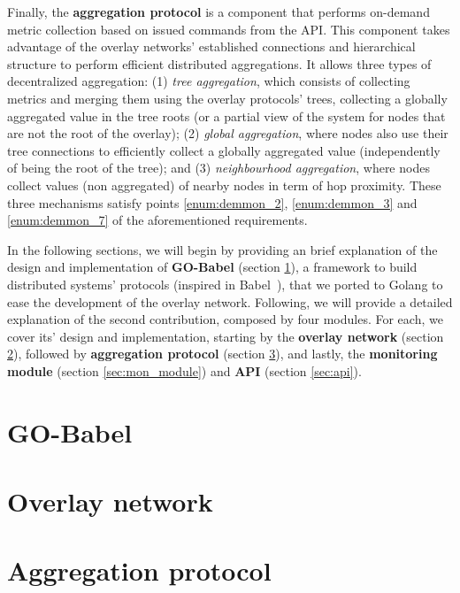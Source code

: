 Finally, the \textbf{aggregation protocol} is a component that performs on-demand metric collection based on issued commands from the API. This component takes advantage of the overlay networks' established connections and hierarchical structure to perform efficient distributed aggregations. It allows three types of decentralized aggregation: (1) \textit{tree aggregation}, which consists of collecting metrics and merging them using the overlay protocols' trees, collecting a globally aggregated value in the tree roots (or a partial view of the system for nodes that are not the root of the overlay); (2) \textit{global aggregation}, where nodes also use their tree connections to efficiently collect a globally aggregated value (independently of being the root of the tree); and (3) \textit{neighbourhood aggregation}, where nodes collect values (non aggregated) of nearby nodes in term of hop proximity. These three mechanisms satisfy points \ref{enum:demmon_2}, \ref{enum:demmon_3} and \ref{enum:demmon_7} of the aforementioned requirements. 

In the following sections, we will begin by providing an brief explanation of the design and implementation of \textbf{GO-Babel} (section \ref{sec:GO-Babel}), a framework to build distributed systems' protocols (inspired in Babel~\cite{babel}), that we ported to Golang to ease the development of the overlay network. Following, we will provide a detailed explanation of the second contribution, composed by four modules. For each, we cover its' design and implementation, starting by the \textbf{overlay network} (section \ref{sec:overlay_network}), followed by \textbf{aggregation protocol} (section \ref{sec:mon_protocol}), and lastly, the \textbf{monitoring module} (section \ref{sec:mon_module}) and \textbf{API} (section \ref{sec:api}). 

\section{GO-Babel} 
\label{sec:GO-Babel}


\section{Overlay network} 
\label{sec:overlay_network}


\section{Aggregation protocol}
\label{sec:mon_protocol}


